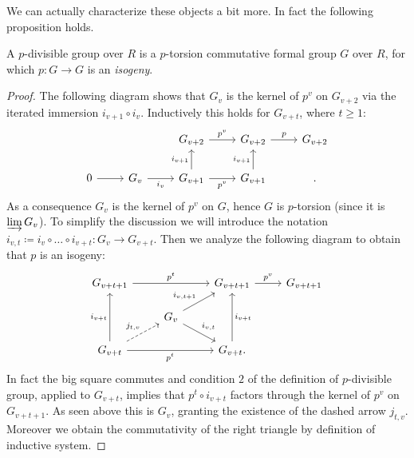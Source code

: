 \documentclass[../Main]{subfiles}
\begin{document}
\noindent
We can actually characterize these objects a bit more. 
In fact the following proposition holds.
\begin{prop}\label{CharactpDivGroups}%
	A $p$-divisible group over $R$ is a $p$-torsion
	commutative formal group $G$ over $R$,
	for which $p\colon G \to G$ is an {\em isogeny}.
\end{prop}
\begin{proof}
	The following diagram shows that $G_v$ is the kernel of $p^v$
	on $G_{v+2}$ via the iterated immersion $i_{v+1} \circ i_v$.
	Inductively this holds for $G_{v+t}$, where $t \geq 1$:
	\begin{equation*}
	\begin{tikzcd}
		&
		&
		G_{v+2} \arrow[r, "p^v", rightarrow] &
		G_{v+2} \arrow[r, "p", rightarrow] &
		G_{v+2}\\
		0 \arrow[r, "", rightarrow] &
		G_{v} \arrow[r, "i_v"', rightarrow] &
		G_{v+1} \arrow[r, "p^v"', rightarrow] 
		\arrow[u, "i_{v+1}", rightarrow] &
		G_{v+1} \arrow[u, "i_{v+1}", rightarrow] &
	.\end{tikzcd}
	\end{equation*}
	As a consequence $G_v$ is the kernel of $p^v$ on $G$,
	hence $G$ is $p$-torsion (since it is $\varinjlim G_v$).
	To simplify the discussion we will introduce the notation
	$i_{v,t} \coloneqq i_v \circ \ldots \circ i_{v+t}\colon G_v \to G_{v + t}$.
	Then we analyze the following diagram to obtain that $p$
	is an isogeny:
	\begin{equation}\label{diag:pDivCharProof}
	\begin{tikzcd}[row sep=1.4em]
		G_{v+t+1} \arrow[rr, "p^t", rightarrow] & &
		G_{v+t+1} \arrow[r, "p^v", rightarrow] &
		G_{v+t+1}\\
		&
		G_v \arrow[ru, "i_{v,t+1}", rightarrow] 
		\arrow[rd, "i_{v,t}", rightarrow] 
		& & \\
		G_{v+t} \arrow[ru, "j_{t,v}", dashrightarrow] 
		\arrow[rr, "p^t"', rightarrow]
		\arrow[uu, "i_{v+t}", rightarrow] & &
		G_{v+t} \arrow[uu, "i_{v+t}"', rightarrow]
	.\end{tikzcd}
	\end{equation}
	In fact the big square commutes and condition $2$ of the definition
	of $p$-divisible group, applied to $G_{v+t}$, implies that $p^t \circ i_{v+t}$
	factors through the kernel of $p^v$ on $G_{v+t+1}$.
	As seen above this is $G_v$, granting the existence of the 
	dashed arrow $j_{t,v}$.
	Moreover we obtain the commutativity of the right triangle by
	definition of inductive system.

\end{proof}
\end{document}
